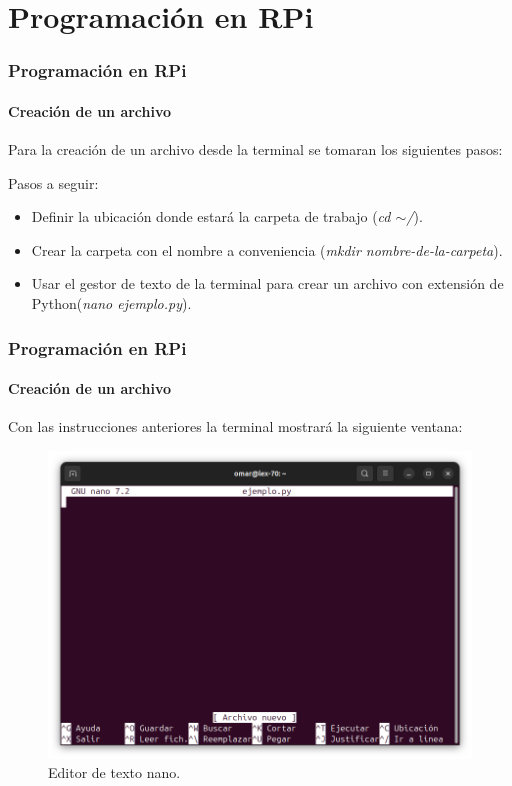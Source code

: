 \documentclass{beamer}
\begin{document}
	\section{Programación en RPi}
	\begin{frame}
		\frametitle{Programación en RPi}
		\framesubtitle{Creación de un archivo}
		Para la creación de un archivo desde la terminal se tomaran los siguientes pasos:
		\begin{mybox}{Pasos a seguir:}
			\begin{itemize}
				\item Definir la ubicación donde estará la carpeta de trabajo (\textit{cd $\sim$/}).
				\item Crear la carpeta con el nombre a conveniencia (\textit{mkdir nombre-de-la-carpeta}).
				\item Usar el gestor de texto de la terminal para crear un archivo con extensión de Python(\textit{nano ejemplo.py}).
			\end{itemize}	
		\end{mybox}
	\end{frame}
	\begin{frame}
		\frametitle{Programación en RPi}
		\framesubtitle{Creación de un archivo}
		Con las instrucciones anteriores la terminal mostrará la siguiente ventana:
		\begin{figure}
			\includegraphics[scale=0.25]{nanorpi.png}
			\caption{Editor de texto nano. }
		\end{figure}
	\end{frame}
\end{document}

